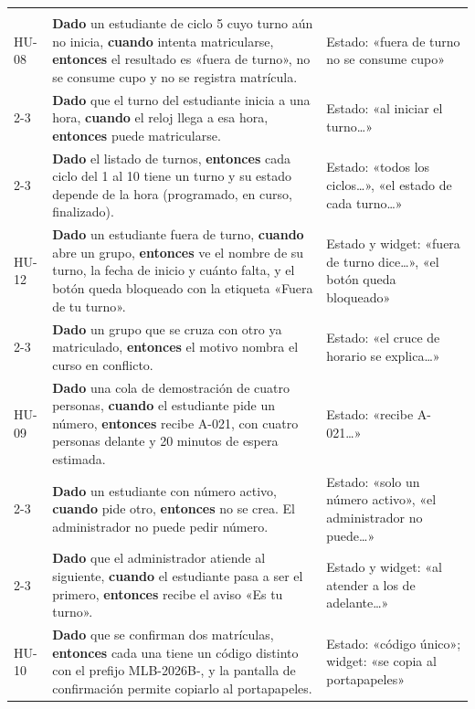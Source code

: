 \begin{longtable}{|p{1.1cm}|p{9.3cm}|p{3.4cm}|}
	\hline
	\cab\hd{HU} & \hd{Criterio de aceptación} & \hd{Prueba}\\
	\hline\endfirsthead
	\hline
	\cab\hd{HU} & \hd{Criterio de aceptación} & \hd{Prueba}\\
	\hline\endhead
	HU-08 & \textbf{Dado} un estudiante de ciclo 5 cuyo turno aún no inicia, \textbf{cuando} intenta matricularse, \textbf{entonces} el resultado es «fuera de turno», no se consume cupo y no se registra matrícula. & Estado: «fuera de turno no se consume cupo» \\\cline{2-3}
	& \textbf{Dado} que el turno del estudiante inicia a una hora, \textbf{cuando} el reloj llega a esa hora, \textbf{entonces} puede matricularse. & Estado: «al iniciar el turno…» \\\cline{2-3}
	& \textbf{Dado} el listado de turnos, \textbf{entonces} cada ciclo del 1 al 10 tiene un turno y su estado depende de la hora (programado, en curso, finalizado). & Estado: «todos los ciclos…», «el estado de cada turno…» \\\hline
	HU-12 & \textbf{Dado} un estudiante fuera de turno, \textbf{cuando} abre un grupo, \textbf{entonces} ve el nombre de su turno, la fecha de inicio y cuánto falta, y el botón queda bloqueado con la etiqueta «Fuera de tu turno». & Estado y widget: «fuera de turno dice…», «el botón queda bloqueado» \\\cline{2-3}
	& \textbf{Dado} un grupo que se cruza con otro ya matriculado, \textbf{entonces} el motivo nombra el curso en conflicto. & Estado: «el cruce de horario se explica…» \\\hline
	HU-09 & \textbf{Dado} una cola de demostración de cuatro personas, \textbf{cuando} el estudiante pide un número, \textbf{entonces} recibe A-021, con cuatro personas delante y 20 minutos de espera estimada. & Estado: «recibe A-021…» \\\cline{2-3}
	& \textbf{Dado} un estudiante con número activo, \textbf{cuando} pide otro, \textbf{entonces} no se crea. El administrador no puede pedir número. & Estado: «solo un número activo», «el administrador no puede…» \\\cline{2-3}
	& \textbf{Dado} que el administrador atiende al siguiente, \textbf{cuando} el estudiante pasa a ser el primero, \textbf{entonces} recibe el aviso «Es tu turno». & Estado y widget: «al atender a los de adelante…» \\\hline
	HU-10 & \textbf{Dado} que se confirman dos matrículas, \textbf{entonces} cada una tiene un código distinto con el prefijo MLB-2026B-, y la pantalla de confirmación permite copiarlo al portapapeles. & Estado: «código único»; widget: «se copia al portapapeles» \\\hline

\end{longtable}

